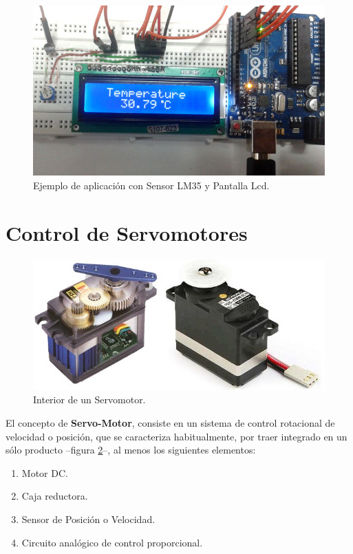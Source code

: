 \documentclass[letterpaper, 10pt]{report}
\begin{document}
\begin{enumerate}
\begin{figure}[h]
\centering
\includegraphics[scale=0.4]{ejemplo.jpg}
\caption{Ejemplo de aplicación con Sensor LM35 y Pantalla Lcd.\label{ejemplo}}
\end{figure}

\end{enumerate} 

\section{Control de Servomotores}

\begin{figure}[h]
\centering
\includegraphics[scale=0.4]{servomotores.jpg}
\caption{Interior de un Servomotor.\label{servo}}
\end{figure}

El concepto de \textbf{Servo-Motor}, consiste en un sistema de control rotacional de velocidad o posición, que se caracteriza habitualmente, por traer integrado en un sólo producto --figura \ref{servo}--, al menos los siguientes elementos:
\begin{enumerate}
	\item Motor DC.
	\item Caja reductora.
	\item Sensor de Posición o Velocidad.
	\item Circuito analógico de control proporcional.
\end{enumerate} 
\end{document}
